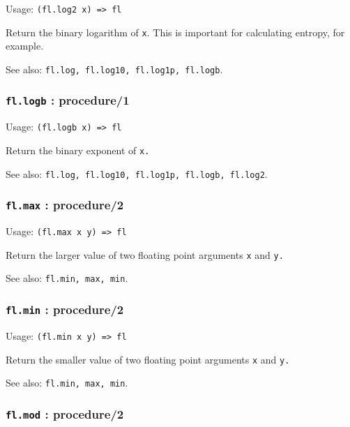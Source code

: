 \documentclass[
]{article}
\newcommand{\passthrough}[1]{#1}
\begin{document}
Usage: \passthrough{\lstinline!(fl.log2 x) => fl!}

Return the binary logarithm of \passthrough{\lstinline!x!}. This is
important for calculating entropy, for example.

See also: \passthrough{\lstinline!fl.log, fl.log10, fl.log1p, fl.logb!}.

\hypertarget{fl.logb-procedure1}{%
\subsubsection{\texorpdfstring{\texttt{fl.logb} :
procedure/1}{fl.logb : procedure/1}}\label{fl.logb-procedure1}}

Usage: \passthrough{\lstinline!(fl.logb x) => fl!}

Return the binary exponent of \passthrough{\lstinline!x.!}

See also:
\passthrough{\lstinline!fl.log, fl.log10, fl.log1p, fl.logb, fl.log2!}.

\hypertarget{fl.max-procedure2}{%
\subsubsection{\texorpdfstring{\texttt{fl.max} :
procedure/2}{fl.max : procedure/2}}\label{fl.max-procedure2}}

Usage: \passthrough{\lstinline!(fl.max x y) => fl!}

Return the larger value of two floating point arguments
\passthrough{\lstinline!x!} and \passthrough{\lstinline!y.!}

See also: \passthrough{\lstinline!fl.min, max, min!}.

\hypertarget{fl.min-procedure2}{%
\subsubsection{\texorpdfstring{\texttt{fl.min} :
procedure/2}{fl.min : procedure/2}}\label{fl.min-procedure2}}

Usage: \passthrough{\lstinline!(fl.min x y) => fl!}

Return the smaller value of two floating point arguments
\passthrough{\lstinline!x!} and \passthrough{\lstinline!y.!}

See also: \passthrough{\lstinline!fl.min, max, min!}.

\hypertarget{fl.mod-procedure2}{%
\subsubsection{\texorpdfstring{\texttt{fl.mod} :
procedure/2}{fl.mod : procedure/2}}\label{fl.mod-procedure2}}
\end{document}
